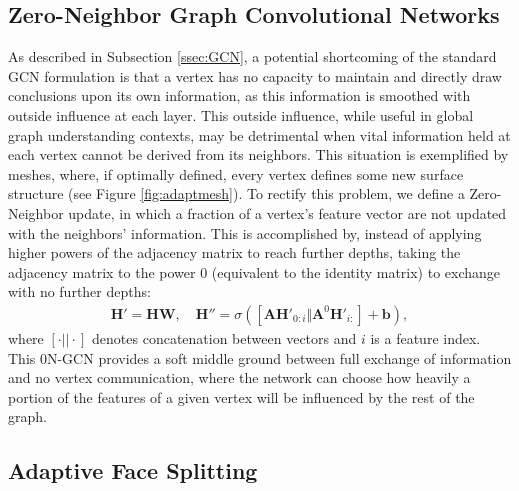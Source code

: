 \documentclass{article}
\begin{document}
\subsection{Zero-Neighbor Graph Convolutional Networks}
\label{ssec:0nGCN}
As described in Subsection \ref{ssec:GCN}, a potential shortcoming of the standard GCN formulation is that a vertex has no capacity to maintain and directly draw conclusions upon its own information, as this information is smoothed with outside influence at each layer. This outside influence, while useful in global graph understanding contexts, may be detrimental when vital information held at each vertex cannot be derived from its neighbors. This situation is exemplified by meshes, where, if optimally defined, every vertex defines some new surface structure (see Figure \ref{fig:adaptmesh}). To rectify this problem, we define a Zero-Neighbor update, in which a fraction of a vertex's feature vector are not updated with the neighbors' information. This is accomplished by, instead of applying higher powers of the adjacency matrix to reach further depths, taking the adjacency matrix to the power $0$ (equivalent to the identity matrix) to exchange with no further depths:
\begin{equation}
\begin{split}
\mathbf{H'} = \mathbf{H}\mathbf{W}, \quad
\mathbf{H''} = \sigma( [\mathbf{A} \mathbf{H'}_{0:i} \Vert \mathbf{A}^0 \mathbf{H'}_{i:}] + \mathbf{b}),
\end{split}
\end{equation}
where $[ \cdot || \cdot]$ denotes concatenation between vectors and $i$ is a feature index. 
This 0N-GCN provides a soft middle ground between full exchange of information and no vertex communication, where the network can choose how heavily a portion of the features of a given vertex will be influenced by the rest of the graph.

\subsection{Adaptive Face Splitting}
\label{ssec:facesplit}
\end{document}
